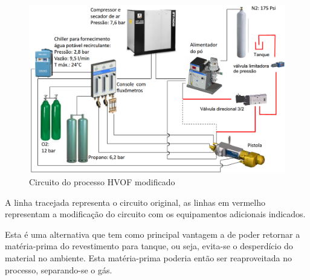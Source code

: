  \begin{figure}[h!]
   \centering
   \includegraphics[width=\columnwidth]{detail/figs/shutter/Circuito_HVOF_mod}
   \caption{Circuito do processo HVOF modificado}
   \label{fig::circuito_hvof}
\end{figure}

A linha tracejada representa o circuito original, as linhas em vermelho
representam a modificação do circuito com os equipamentos adicionais indicados.

Esta é uma alternativa que tem como principal vantagem a de poder retornar a
matéria-prima do revestimento para tanque, ou seja, evita-se
o desperdício do material no ambiente. Esta matéria-prima poderia então ser
reaproveitada no processo, separando-se o gás.
